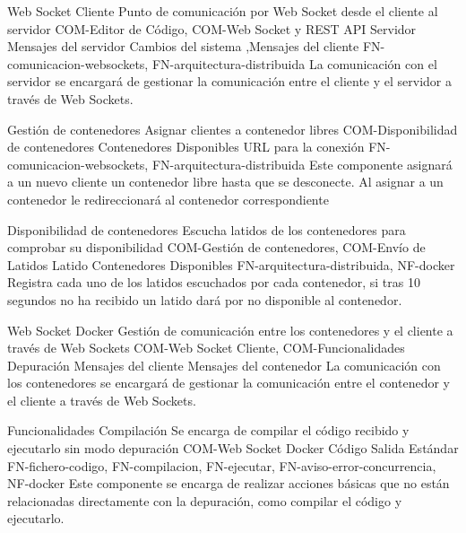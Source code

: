 \begin{component}{Web Socket Cliente}
{Punto de comunicación por Web Socket desde el cliente al servidor}
{COM-Editor de Código, COM-Web Socket y REST API Servidor} %
{Mensajes del servidor} %
{Cambios del sistema ,Mensajes del cliente} %
{FN-comunicacion-websockets, FN-arquitectura-distribuida} %
La comunicación con el servidor se encargará de gestionar la comunicación entre el cliente y el servidor a través de Web Sockets. %
\end{component}


\begin{component}{Gestión de contenedores}
{Asignar clientes a contenedor libres}
{COM-Disponibilidad de contenedores} %
{Contenedores Disponibles} %
{URL para la conexión} %
{FN-comunicacion-websockets, FN-arquitectura-distribuida} %
Este componente asignará a un nuevo cliente un contenedor libre hasta que se desconecte. Al asignar a un contenedor le redireccionará al contenedor correspondiente %
\end{component}

\begin{component}{Disponibilidad de contenedores}
{Escucha latidos de los contenedores para comprobar su disponibilidad }
{COM-Gestión de contenedores, COM-Envío de Latidos} %
{Latido} %
{Contenedores Disponibles} %
{FN-arquitectura-distribuida, NF-docker} %
Registra cada uno de los latidos escuchados por cada contenedor, si tras 10 segundos no ha recibido un latido dará por no disponible al contenedor. %
\end{component}


\begin{component}{Web Socket Docker}
{Gestión de comunicación entre los contenedores y el cliente a través de Web Sockets}
{COM-Web Socket Cliente, COM-Funcionalidades Depuración} %
{Mensajes del cliente} %
{Mensajes del contenedor} %
{\NA} %
La comunicación con los contenedores se encargará de gestionar la comunicación entre el contenedor y el cliente a través de Web Sockets. %
\end{component}

\begin{component}{Funcionalidades Compilación}
{Se encarga de compilar el código recibido y ejecutarlo sin modo depuración}
{COM-Web Socket Docker}
{Código}
{Salida Estándar}
{FN-fichero-codigo, FN-compilacion, FN-ejecutar, FN-aviso-error-concurrencia, NF-docker}
Este componente se encarga de realizar acciones básicas que no están relacionadas directamente con la depuración, como compilar el código y ejecutarlo.
\end{component}

